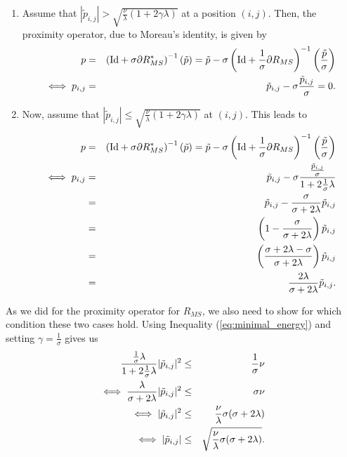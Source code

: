 \documentclass[abstracton]{scrreprt}
\begin{document}
            \begin{enumerate}
                \item Assume that $|\tilde{p}_{i,j}| > \sqrt{\frac{\nu}{\lambda}(1 + 2\gamma\lambda)}$ at a position $(i,j)$. Then, the proximity operator, due to Moreau's identity, is given by
                    \begin{eqnarray}
                        p &=& \left( \textnormal{Id} + \sigma \partial R_{MS}^{\ast} \right)^{-1}(\tilde{p}) = \tilde{p} - \sigma \left( \textnormal{Id} + \frac{1}{\sigma} \partial R_{MS} \right)^{-1} \left(\frac{\tilde{p}}{\sigma} \right) \notag \\
                        \iff p_{i,j} &=& \tilde{p}_{i,j} - \sigma \frac{\tilde{p}_{i,j}}{\sigma} = 0. \notag
                    \end{eqnarray}
                \item Now, assume that $|\tilde{p}_{i,j}| \le \sqrt{\frac{\nu}{\lambda}(1 + 2\gamma\lambda)}$ at $(i,j)$. This leads to
                    \begin{eqnarray}
                        p &=& \left( \textnormal{Id} + \sigma \partial R_{MS}^{\ast} \right)^{-1}(\tilde{p}) = \tilde{p} - \sigma \left( \textnormal{Id} + \frac{1}{\sigma} \partial R_{MS} \right)^{-1} \left(\frac{\tilde{p}}{\sigma} \right) \notag \\
                        \iff p_{i,j} &=& \tilde{p}_{i,j} - \sigma \frac{\frac{\tilde{p}_{i,j}}{\sigma}}{1 + 2\frac{1}{\sigma}\lambda} \notag \\
                        &=& \tilde{p}_{i,j} - \frac{\sigma}{\sigma + 2\lambda}\tilde{p}_{i,j} \notag \\
                        &=& \left(1 - \frac{\sigma}{\sigma + 2\lambda}\right) \tilde{p}_{i,j} \notag \\
                        &=& \left(\frac{\sigma + 2\lambda - \sigma}{\sigma + 2\lambda}\right) \tilde{p}_{i,j} \notag \\
                        &=& \frac{2\lambda}{\sigma + 2\lambda} \tilde{p}_{i,j}. \notag
                    \end{eqnarray}
            \end{enumerate}
            As we did for the proximity operator for $R_{MS}$, we also need to show for which condition these two cases hold. Using Inequality (\ref{eq:minimal_energy}) and setting $\gamma = \frac{1}{\sigma}$ gives us
                \begin{eqnarray}
                    \frac{\frac{1}{\sigma}\lambda}{1 + 2\frac{1}{\sigma}\lambda} |\tilde{p}_{i,j}|^{2} &\le& \frac{1}{\sigma} \nu \notag \\
                    \iff \frac{\lambda}{\sigma + 2\lambda} |\tilde{p}_{i,j}|^{2} &\le& \sigma \nu \notag \\
                    \iff |\tilde{p}_{i,j}|^{2} &\le& \frac{\nu}{\lambda}\sigma(\sigma + 2\lambda) \notag \\
                    \iff |\tilde{p}_{i,j}| &\le& \sqrt{\frac{\nu}{\lambda}\sigma(\sigma + 2\lambda)}. \notag
                \end{eqnarray}
\end{document}
